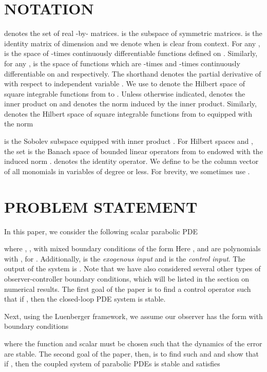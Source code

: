 \documentclass[US letter, 9 pt, conference]{ieeeconf}  \usepackage{setspace}
\begin{document}
\section{NOTATION}\label{sec:notation}


 denotes the set of real -by- matrices.  is the subspace of symmetric matrices.  is the identity matrix of dimension  and we denote  when  is clear from context. For any ,  is the space of -times continuously differentiable functions defined on . Similarly, for any ,  is the space of functions which are -times and -times continuously differentiable on  and  respectively.  The shorthand  denotes the partial derivative of  with respect to independent variable . We use  to denote the Hilbert space of square integrable functions from  to .
Unless otherwise indicated,  denotes the inner product on  and  denotes the norm induced by the inner product. Similarly,  denotes the Hilbert space of square integrable functions from  to  equipped with the norm

 is the Sobolev subspace equipped with inner product . For Hilbert spaces  and , the set  is the Banach space of bounded linear operators from  to  endowed with the induced norm .  denotes the identity operator.
We define  to be the column vector of all monomials in variables  of degree  or less. For brevity, we sometimes use .

\section{PROBLEM STATEMENT}\label{sec:pro_state}
In this paper, we consider the following scalar parabolic PDE

where , , with mixed boundary conditions of the form
 Here ,  and  are polynomials with , for . Additionally,  is the \textit{exogenous input} and  is the \textit{control input}. The output of the system is . Note that we have also considered several other types of observer-controller boundary conditions, which will be listed in the section on numerical results. The first goal of the paper is to find a control operator  such that if , then the closed-loop PDE system is stable.

Next, using the Luenberger framework, we assume our observer has the form
 with boundary conditions

where the function  and scalar  must be chosen such that the dynamics of the error  are stable. The second goal of the paper, then, is to find such  and  and show that if , then the coupled system of parabolic PDEs is stable and satisfies
\end{document}
